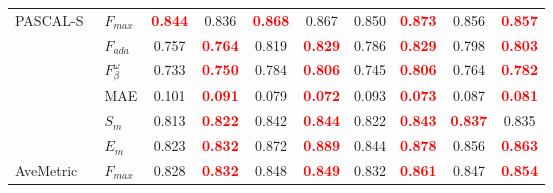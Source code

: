 \documentclass[runningheads]{llncs}
\begin{document}
\begin{table}[H]
{\begin{tabular}{l|l|cc|cc|cc|cc}
   \multirow{6}{*}{PASCAL-S~\cite{PASCAL-S}}   & $F_{max}$                                                   & \textcolor{red}{\textbf{0.844}} & 0.836                           & \textcolor{red}{\textbf{0.868}} & 0.867                           & 0.850 & \textcolor{red}{\textbf{0.873}} & 0.856                           & \textcolor{red}{\textbf{0.857}} \\
                                               & $F_{ada}$                                                   & 0.757                           & \textcolor{red}{\textbf{0.764}} & 0.819                           & \textcolor{red}{\textbf{0.829}} & 0.786 & \textcolor{red}{\textbf{0.829}} & 0.798                           & \textcolor{red}{\textbf{0.803}} \\
                                               & $F^{\omega}_{\beta}$                                        & 0.733                           & \textcolor{red}{\textbf{0.750}} & 0.784                           & \textcolor{red}{\textbf{0.806}} & 0.745 & \textcolor{red}{\textbf{0.806}} & 0.764                           & \textcolor{red}{\textbf{0.782}} \\
                                               & MAE                                                         & 0.101                           & \textcolor{red}{\textbf{0.091}} & 0.079                           & \textcolor{red}{\textbf{0.072}} & 0.093 & \textcolor{red}{\textbf{0.073}} & 0.087                           & \textcolor{red}{\textbf{0.081}} \\
                                               & $S_{m}$                                                     & 0.813                           & \textcolor{red}{\textbf{0.822}} & 0.842                           & \textcolor{red}{\textbf{0.844}} & 0.822 & \textcolor{red}{\textbf{0.843}} & \textcolor{red}{\textbf{0.837}} & 0.835                           \\
                                               & $E_{m}$                                                     & 0.823                           & \textcolor{red}{\textbf{0.832}} & 0.872                           & \textcolor{red}{\textbf{0.889}} & 0.844 & \textcolor{red}{\textbf{0.878}} & 0.856                           & \textcolor{red}{\textbf{0.863}} \\ \hline
   \multirow{6}{*}{AveMetric}                  & $F_{max}$                                                   & 0.828                           & \textcolor{red}{\textbf{0.832}} & 0.848                           & \textcolor{red}{\textbf{0.849}} & 0.832 & \textcolor{red}{\textbf{0.861}} & 0.847                           & \textcolor{red}{\textbf{0.854}} \\

\end{tabular}}
\end{table}
\end{document}
